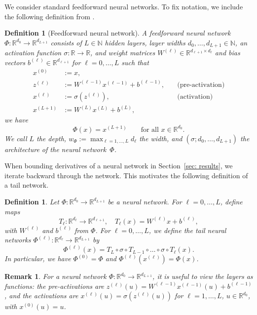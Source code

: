 \documentclass[a4paper, 11pt]{article}
\newtheorem{definition}[theorem]{Definition}
\newtheorem{remark}[theorem]{Remark}
\begin{document}
	We consider standard feedforward neural networks. To fix notation, we include the following definition from \cite{petersenzech}.
	
	\begin{definition}[Feedforward neural network]\label{def: neural network}
		A feedforward neural network $\Phi:\mathbb{R}^{d_0}\to\mathbb{R}^{d_{L+1}}$ consists of $L\in\mathbb{N}$ hidden layers, layer widths $d_0,\dots,d_{L+1}\in\mathbb{N}$, an activation function $\sigma:\mathbb{R}\to\mathbb{R}$, and weight matrices
		$W^{(\ell)}\in\mathbb{R}^{d_{\ell+1}\times d_\ell}$ and bias vectors $b^{(\ell)}\in\mathbb{R}^{d_{\ell+1}}$ for $\ell = 0, \dots, L$
		such that
		\begin{align*}
			{x}^{(0)} &:= x, \nonumber \\
			z^{(\ell)} &:= W^{(\ell-1)}x^{(\ell-1)}+b^{(\ell-1)}, \quad &\text{(pre-activation)} \\
			x^{(\ell)} &:= \sigma(z^{(\ell)}),  \quad &\text{(activation)} \\
			x^{(L+1)} &:= W^{(L)}x^{(L)}+b^{(L)}\nonumber, 
		\end{align*}
		we have
		\[
		\Phi(x)=x^{(L+1)}\qquad\text{for all }x\in\mathbb{R}^{d_0}.
		\]
		We call $L$ the depth, $w_\Phi:=\max_{\ell=1,\dots,L} d_\ell$ the {width}, and $(\sigma; d_0,\dots,d_{L+1})$ the {architecture} of the neural network~$\Phi$.
	\end{definition}
	
	When bounding derivatives of a neural network in Section~\ref{sec: results}, we iterate backward through the network. This motivates the following definition of a tail network.
	
	\begin{definition}\label{def: tail nn}
		Let $\Phi: \mathbb{R}^{d_0} \to \mathbb{R}^{d_{L+1}}$ be a neural network. For $\ell = 0,\dotsc, L$, define maps
		$$ T_\ell: \mathbb{R}^{d_\ell} \to \mathbb{R}^{d_{\ell+1}}, \quad  T_\ell (x) = W^{(\ell)}x + b^{(\ell)},$$
		with $W^{(\ell)}$ and $b^{(\ell)}$ from $\Phi$. For $\ell =0,\dotsc, L$, we define the tail neural networks $\Phi^{(\ell)}: \mathbb{R}^{d_\ell} \to \mathbb{R}^{d_{L+1}}$ by
		$$ \Phi^{(\ell)}(x) = T_{L}\circ \sigma \circ T_{L-1}\circ  \dots \circ \sigma \circ T_\ell(x). $$
		In particular, we have $\Phi^{(0)}=\Phi$ and $\Phi^{(\ell)}(x^{(\ell)}) = \Phi(x)$.
	\end{definition}
	
	\begin{remark}
		For a neural network $\Phi: \mathbb{R}^{d_0} \to \mathbb{R}^{d_{L+1}}$, it is useful to view the layers as functions: the pre-activations are $z^{(\ell)}(u)=W^{(\ell-1)}x^{(\ell-1)}(u)+b^{(\ell-1)}$, and the activations are $x^{(\ell)}(u)=\sigma(z^{(\ell)}(u))$ for $\ell=1,\dots,L$, $u \in \mathbb{R}^{d_0}$, with $x^{(0)}(u)=u$.
	\end{remark}
	
\end{document}
